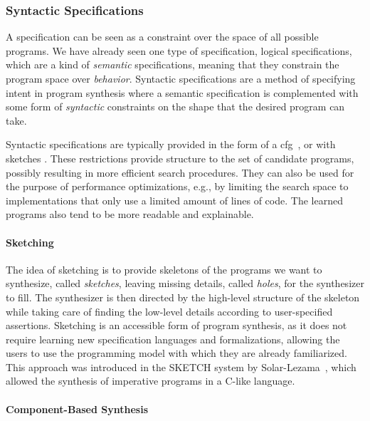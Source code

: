 \subsubsection{Syntactic Specifications}
\label{sec:syntactic-specifications}

A specification can be seen as a constraint over the space of all possible
programs. We have already seen one type of specification, logical
specifications, which are a kind of \textit{semantic} specifications, meaning
that they constrain the program space over \textit{behavior}. Syntactic
specifications are a method of specifying intent in program synthesis where a
semantic specification is complemented with some form of \textit{syntactic}
constraints on the shape that the desired program can take.

Syntactic specifications are typically provided in the form of a
\gls{cfg}~\cite{Alur:sygus:2013}, or with sketches \cite{Solar-Lezama:2008}.
These restrictions provide structure to the set of candidate programs, possibly
resulting in more efficient search procedures. They can also be used for the
purpose of performance optimizations, e.g., by limiting the search space to
implementations that only use a limited amount of lines of code. The learned
programs also tend to be more readable and explainable.

\paragraph{Sketching}
\label{sec:sketching}

The idea of sketching is to provide skeletons of the programs we want to
synthesize, called \textit{sketches}, leaving missing details, called
\textit{holes}, for the synthesizer to fill. The synthesizer is then directed by
the high-level structure of the skeleton while taking care of finding the
low-level details according to user-specified assertions.
Sketching is an accessible form of program synthesis, as it does not require
learning new specification languages and formalizations, allowing the users to
use the programming model with which they are already familiarized.
This approach was introduced in the SKETCH system by
Solar-Lezama~\cite{Solar-Lezama:2008}, which allowed the synthesis of imperative
programs in a C-like language.

\paragraph{Component-Based Synthesis}
\label{sec:components}

